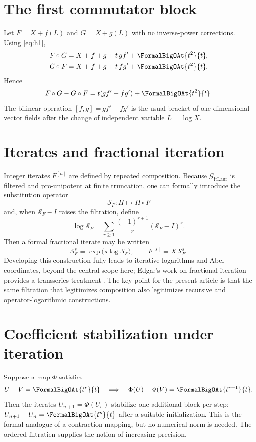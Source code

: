 \documentclass[11pt,oneside]{book}
\theoremstyle{definition}
\theoremstyle{remark}
\newcommand{\compose}{\mathbin{\circ}}
\begin{document}
\section{The first commutator block}
Let $F=X+f(L)$ and $G=X+g(L)$ with no inverse-power corrections.  Using
\eqref{eq:h1},
\begin{align*}
 F\compose G&=X+f+g+t\,g f'+\FormalBigOAt{t^2}{t},\\
 G\compose F&=X+f+g+t\,f g'+\FormalBigOAt{t^2}{t}.
\end{align*}
Hence
\begin{equation}\label{eq:first-commutator}
 F\compose G-G\compose F
 =t(gf'-fg')+\FormalBigOAt{t^2}{t}.
\end{equation}
The bilinear operation $[f,g]=gf'-fg'$ is the usual bracket of one-dimensional
vector fields after the change of independent variable $L=\log X$.

\section{Iterates and fractional iteration}
Integer iterates $F^{[n]}$ are defined by repeated composition.  Because
$\mathcal G_{\mathrm{itLaur}}$ is filtered and pro-unipotent at finite truncation, one can
formally introduce the substitution operator
\[
 \mathcal S_F:H\longmapsto H\compose F
\]
and, when $\mathcal S_F-I$ raises the filtration, define
\begin{equation}\label{eq:substitution-log}
 \log\mathcal S_F
 =\sum_{r\ge1}\frac{(-1)^{r+1}}r(\mathcal S_F-I)^r.
\end{equation}
Then a formal fractional iterate may be written
\[
 \mathcal S_F^s=\exp\bigl(s\log\mathcal S_F\bigr),
 \qquad
 F^{[s]}=X\,\mathcal S_F^s.
\]
Developing this construction fully leads to iterative logarithms and Abel
coordinates, beyond the central scope here; Edgar's work on fractional
iteration provides a transseries treatment \cite{EdgarFractional}.  The key
point for the present article is that the same filtration that legitimizes
composition also legitimizes recursive and operator-logarithmic constructions.

\section{Coefficient stabilization under iteration}
Suppose a map $\Phi$ satisfies
\begin{equation}\label{eq:contraction-general}
 U-V=\FormalBigOAt{t^r}{t}
 \quad\Longrightarrow\quad
 \Phi(U)-\Phi(V)=\FormalBigOAt{t^{r+1}}{t}.
\end{equation}
Then the iterates $U_{n+1}=\Phi(U_n)$ stabilize one additional block per step:
$U_{n+1}-U_n=\FormalBigOAt{t^n}{t}$ after a suitable initialization.  This is the
formal analogue of a contraction mapping, but no numerical norm is needed.
The ordered filtration supplies the notion of increasing precision.
\end{document}
